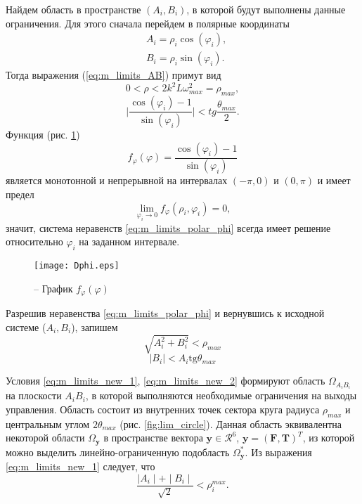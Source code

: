 Найдем область в пространстве $(A_i, B_i)$, в которой будут выполнены данные ограничения. Для этого сначала перейдем в полярные координаты
\begin{equation} \label{eq:m_polar}
\begin{aligned}
&A_i = \rho_i \cos(\varphi_i),
\\
&B_i = \rho_i \sin(\varphi_i).
\end{aligned}
\end{equation}
Тогда выражения (\ref{eq:m_limits_AB}) примут вид
\begin{equation} \label{eq:m_limits_polar_rho}
0 < \rho < 
2 k^2 L\omega_{max}^2
= \rho_{max},
\end{equation}
\begin{equation} \label{eq:m_limits_polar_phi}
\Bigg| \frac{\cos(\varphi_i)-1}{\sin(\varphi_i)} \Bigg| < 
tg\frac{\theta_{max}}{2}.
\end{equation}
Функция (рис. \ref{fig:f_phi})
$$f_{\varphi}(\varphi) = \frac{\cos(\varphi_i)-1}{\sin(\varphi_i)}$$
является монотонной и непрерывной на интервалах 
$(-{\pi}, 0)$
и
$( 0, \pi)$
и имеет предел
$$\lim_{\varphi_i \to 0}
f_{\varphi}(\rho_i, \varphi_i) = 0,$$
значит, система неравенств
\eqref{eq:m_limits_polar_phi}
всегда имеет решение относительно $\varphi_i$ на заданном интервале.
\begin{figure}[h!]
	\centering
	\texttt{[image: Dphi.eps]}
	\caption{ -- График $f_{\varphi}(\varphi)$}
	\label{fig:f_phi}
\end{figure}
Разрешив неравенства \eqref{eq:m_limits_polar_phi} и вернувшись к исходной системе ($A_i, B_i$), запишем
\begin{equation} \label{eq:m_limits_new_1}
\sqrt{A^2_i +  B^2_i} <
\rho_{max}
\end{equation}
\begin{equation} \label{eq:m_limits_new_2}
|B_i| < A_i \text{tg} \theta_{max}
\end{equation}

Условия \eqref{eq:m_limits_new_1}, \eqref{eq:m_limits_new_2} формируют область $\Omega_{A_iB_i}$ на плоскости $A_iB_i$, в которой выполняются необходимые ограничения на выходы управления. Область состоит из внутренних точек сектора круга радиуса $\rho_{max}$ и центральным углом $2\theta_{max}$ (рис. \ref{fig:lim_circle}).
Данная область эквивалентна некоторой области $\Omega_{\bm{y}}$ в пространстве вектора  $\bm{y} \in \mathcal{R}^6$, $\bm{y} = (\bm{F}, \bm{T})^T$, из которой можно выделить линейно-ограниченную подобласть $\Omega^*_{\bm{y}}$.
Из выражения \eqref{eq:m_limits_new_1} следует, что
\begin{equation} \label{eq:rho_limits_lin}
\frac{\mid A_i \mid + \mid B_i \mid} {\sqrt2}
< \rho_i^{max}.
\end{equation}

